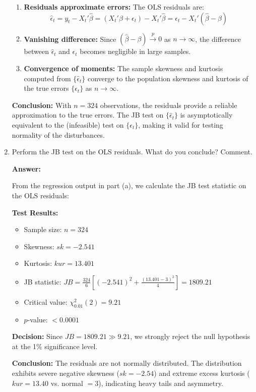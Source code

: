 \documentclass[12pt,a4paper]{article}
\begin{document}
\begin{enumerate}[label=(\alph*)]
\begin{enumerate}
\item \textbf{Residuals approximate errors:} The OLS residuals are:
$$\hat{\epsilon}_t = y_t - X_t'\hat{\beta} = (X_t'\beta + \epsilon_t) - X_t'\hat{\beta} = \epsilon_t - X_t'(\hat{\beta} - \beta)$$

\item \textbf{Vanishing difference:} Since $(\hat{\beta} - \beta) \xrightarrow{p} 0$ as $n \to \infty$, the difference between $\hat{\epsilon}_t$ and $\epsilon_t$ becomes negligible in large samples.

\item \textbf{Convergence of moments:} The sample skewness and kurtosis computed from $\{\hat{\epsilon}_t\}$ converge to the population skewness and kurtosis of the true errors $\{\epsilon_t\}$ as $n \to \infty$.
\end{enumerate}

\textbf{Conclusion:} With $n = 324$ observations, the residuals provide a reliable approximation to the true errors. The JB test on $\{\hat{\epsilon}_t\}$ is asymptotically equivalent to the (infeasible) test on $\{\epsilon_t\}$, making it valid for testing normality of the disturbances.
  
  \item Perform the JB test on the OLS residuals. What do you conclude? Comment.

  \textbf{Answer:}

From the regression output in part (a), we calculate the JB test statistic on the OLS residuals:

\textbf{Test Results:}
\begin{itemize}
\item Sample size: $n = 324$
\item Skewness: $sk = -2.541$
\item Kurtosis: $kur = 13.401$
\item JB statistic: $JB = \frac{324}{6}\left[(-2.541)^2 + \frac{(13.401-3)^2}{4}\right] = 1809.21$
\item Critical value: $\chi^2_{0.01}(2) = 9.21$
\item $p$-value: $< 0.0001$
\end{itemize}

\textbf{Decision:} Since $JB = 1809.21 \gg 9.21$, we strongly reject the null hypothesis at the 1\% significance level.

\textbf{Conclusion:} The residuals are not normally distributed. The distribution exhibits severe negative skewness ($sk = -2.54$) and extreme excess kurtosis ($kur = 13.40$ vs. normal $= 3$), indicating heavy tails and asymmetry.


\end{enumerate}
\end{document}
